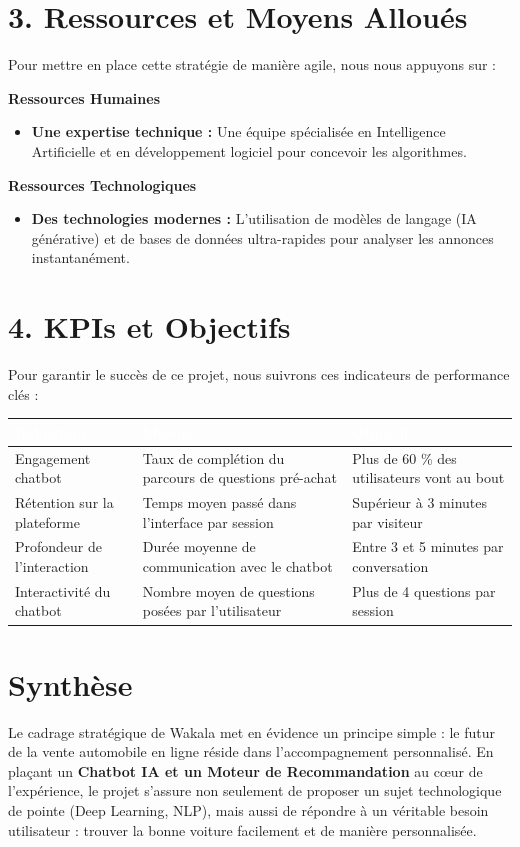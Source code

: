 \documentclass[a4paper, 11pt]{article}
\begin{document}
\section*{3. Ressources et Moyens Alloués}
Pour mettre en place cette stratégie de manière agile, nous nous appuyons sur :

\vspace{0.2cm}
\textbf{Ressources Humaines}
\begin{itemize}[label=\textbullet]
    \item \textbf{Une expertise technique :} Une équipe spécialisée en Intelligence Artificielle et en développement logiciel pour concevoir les algorithmes.
\end{itemize}

\textbf{Ressources Technologiques}
\begin{itemize}[label=\textbullet]
    \item \textbf{Des technologies modernes :} L'utilisation de modèles de langage (IA générative) et de bases de données ultra-rapides pour analyser les annonces instantanément.
\end{itemize}

\newpage
\section*{4. KPIs et Objectifs}
Pour garantir le succès de ce projet, nous suivrons ces indicateurs de performance clés :

\vspace{0.2cm}
\begin{longtable}{L{4cm} L{6cm} L{5cm}}
\toprule
{}
\textcolor{white}{\textbf{Indicateur}} & \textcolor{white}{\textbf{Mesure}} & \textcolor{white}{\textbf{Objectif}} \\
\midrule
\endhead
Engagement chatbot & Taux de complétion du parcours de questions pré-achat & Plus de 60 \% des utilisateurs vont au bout \\
Rétention sur la plateforme & Temps moyen passé dans l'interface par session & Supérieur à 3 minutes par visiteur \\
Profondeur de l'interaction & Durée moyenne de communication avec le chatbot & Entre 3 et 5 minutes par conversation \\
Interactivité du chatbot & Nombre moyen de questions posées par l'utilisateur & Plus de 4 questions par session \\
\bottomrule
\end{longtable}

\section*{Synthèse}
Le cadrage stratégique de Wakala met en évidence un principe simple : le futur de la vente automobile en ligne réside dans l'accompagnement personnalisé. En plaçant un \textbf{Chatbot IA et un Moteur de Recommandation} au cœur de l'expérience, le projet s'assure non seulement de proposer un sujet technologique de pointe (Deep Learning, NLP), mais aussi de répondre à un véritable besoin utilisateur : trouver la bonne voiture facilement et de manière personnalisée.
\end{document}
